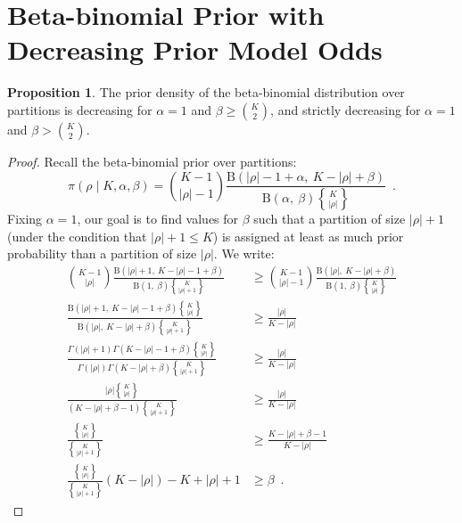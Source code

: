 \documentclass[11pt,a4paper]{article}
\theoremstyle{definition} %
\newtheorem{prop}{Proposition}
\theoremstyle{case}
\newcommand{\FGamma}[1]{\Gamma\left({#1}\right)}
\newcommand{\FBeta}[2]{\text{B}\left({#1},\ {#2}\right)}
\DeclareRobustCommand{\stirling}{\genfrac\{\}{0pt}{}}
\begin{document}
\section{Beta-binomial Prior with Decreasing Prior Model Odds} \label{ap:decreasing-odds}
\begin{prop}\label{prop:monotonicity}
The prior density of the beta-binomial distribution over partitions is decreasing for $\alpha = 1$ and $\beta \geq \binom{K}{2}$, and strictly decreasing for $\alpha = 1$ and $\beta > \binom{K}{2}$.
\end{prop}

\iffalse
\begin{proof}
Recall the beta-binomial prior over partitions:
\begin{equation}
    \pi(\rho \mid K, \alpha, \beta) = \binom{K - 1}{|\rho| - 1} 
    \frac{\FBeta{|\rho| - 1 + \alpha}{K - |\rho| + \beta}}
    {\FBeta{\alpha}{\beta}\stirling{K}{|\rho|}} \enspace .
\end{equation}
Fixing $\alpha = 1$, our goal is to find values for $\beta$ such that a partition of size $|\rho| + 1$ (under the condition that $|\rho| + 1 \leq K$) is assigned at least as much prior probability than a partition of size $|\rho|$. We write:
\begin{align}
    \binom{K - 1}{|\rho|} 
    \frac{\FBeta{|\rho| + 1}{K - |\rho| - 1 + \beta}}
    {\FBeta{1}{\beta}\stirling{K}{|\rho| + 1}} &\geq \binom{K - 1}{|\rho| - 1} 
    \frac{\FBeta{|\rho|}{K - |\rho| + \beta}}
    {\FBeta{1}{\beta}\stirling{K}{|\rho|}} \\[0.50em]
    \frac{\FBeta{|\rho| + 1}{K - |\rho| - 1 + \beta}\stirling{K}{|\rho|}}
    {\FBeta{|\rho|}{K - |\rho| + \beta}\stirling{K}{|\rho| + 1}} &\geq \frac{|\rho|}{K - |\rho|} \\[0.50em]
    \frac{\FGamma{|\rho| + 1}\FGamma{K - |\rho| - 1 + \beta}\stirling{K}{|\rho|}}
    {\FGamma{|\rho|}\FGamma{K - |\rho| + \beta}\stirling{K}{|\rho| + 1}} &\geq \frac{|\rho|}{K - |\rho|} \\[0.50em]
    \frac{|\rho|\stirling{K}{|\rho|}}
    {(K - |\rho| + \beta - 1)\stirling{K}{|\rho| + 1}} &\geq \frac{|\rho|}{K - |\rho|} \\[0.50em]
    \frac{\stirling{K}{|\rho|}}
    {\stirling{K}{|\rho| + 1}} &\geq \frac{K - |\rho| + \beta - 1}{K - |\rho|} \\[0.50em]
    \frac{\stirling{K}{|\rho|}}
    {\stirling{K}{|\rho| + 1}} (K - |\rho|) - K + |\rho| + 1 &\geq \beta \enspace .
\end{align}
\end{proof}
\end{document}
